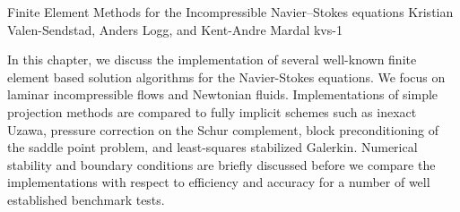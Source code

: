               {Finite Element Methods for the Incompressible Navier--Stokes equations}
              {Kristian Valen-Sendstad, Anders Logg, and Kent-Andre Mardal}
              {kvs-1}

In this chapter, we discuss the implementation of several well-known
finite element based solution algorithms for the Navier-Stokes
equations. We focus on laminar incompressible flows and Newtonian
fluids. Implementations of simple projection methods are compared to
fully implicit schemes such as inexact Uzawa, pressure correction on
the Schur complement, block preconditioning of the saddle point
problem, and least-squares stabilized Galerkin. Numerical stability
and boundary conditions are briefly discussed before we compare the
implementations with respect to efficiency and accuracy for a number
of well established benchmark tests.
